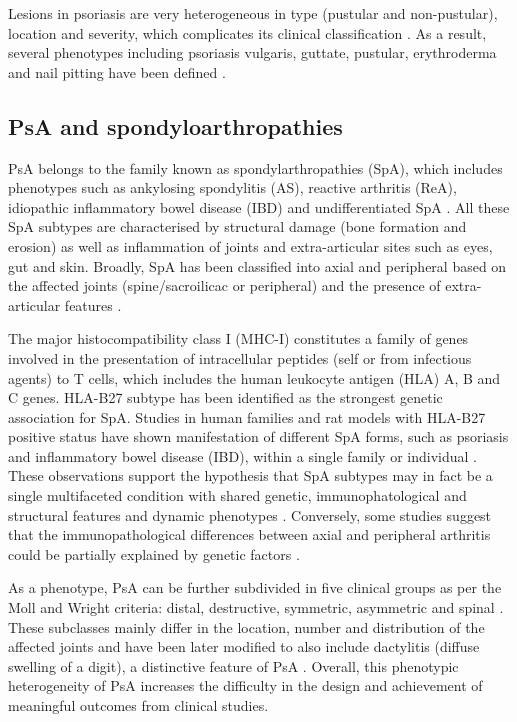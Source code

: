 Lesions in psoriasis are very heterogeneous in type (pustular and non-pustular), location and severity, which complicates its clinical classification \parencite{Perera2012}. As a result, several phenotypes including psoriasis vulgaris, guttate, pustular, erythroderma and nail pitting have been defined \parencite{Marrakchi2011}.



\subsection{PsA and spondyloarthropathies}
%
PsA belongs to the family known as spondylarthropathies (SpA), which includes phenotypes such as ankylosing spondylitis (AS), reactive arthritis (ReA), idiopathic inflammatory bowel disease (IBD) and undifferentiated SpA \parencite{Baeten2013}. All these SpA subtypes are characterised by structural damage (bone formation and erosion) as well as inflammation of joints and extra-articular sites such as eyes, gut and skin. Broadly, SpA has been classified into axial and peripheral based on the affected joints (spine/sacroilicac or peripheral) and the presence of extra-articular features \parencite{Runwaleit2001, Runwaleit2001}. 


The major histocompatibility class I (MHC-I) constitutes a family of genes involved in the presentation of intracellular peptides (self or from infectious agents) to T cells, which includes the human leukocyte antigen (HLA) A, B and C genes. HLA-B27 subtype has been identified as the strongest genetic association for SpA. Studies in human families and rat models with HLA-B27 positive status have shown manifestation of different SpA forms, such as psoriasis and inflammatory bowel disease (IBD), within a single family or individual \parencite{Hammer1990,Said-Nahal2000}. These observations support the hypothesis that SpA subtypes may in fact be a single multifaceted condition with shared genetic, immunophatological and structural features and dynamic phenotypes \parencite{Baeten2013}. Conversely, some studies suggest that the immunopathological differences between axial and peripheral arthritis could be partially explained by genetic factors \parencite{Porcher2005, Appel2011, Noordenbos2012}.

As a phenotype, PsA can be further subdivided in five clinical groups as per the Moll and Wright criteria: distal, destructive, symmetric, asymmetric and spinal \parencite{Moll1973}. These subclasses mainly differ in the location, number and distribution of the affected joints and have been later modified to also include dactylitis (diffuse swelling of a digit), a distinctive feature of PsA \parencite{Reich2009}. Overall, this phenotypic heterogeneity of PsA increases the difficulty in the design and achievement of meaningful outcomes from clinical studies.




